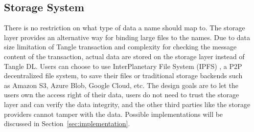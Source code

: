\subsection{Storage System}
There is no restriction on what type of data a name should map to. The storage layer provides an alternative way for binding large files to the names.
Due to data size limitation of Tangle transaction and complexity for checking the message content of the transaction, actual data are stored on the storage layer instead of Tangle DL.
Users can choose to use InterPlanetary File System (IPFS) \cite{benet2014ipfs}, a P2P decentralized file system, to save their files or traditional storage backends such as Amazon S3, Azure Blob, Google Cloud, etc.
The design goals are to let the users own the access right of their data, users do not need to trust the storage layer and can verify the data integrity, and the other third parties like the storage providers cannot tamper with the data.
Possible implementations will be discussed in Section~\ref{sec:implementation}.